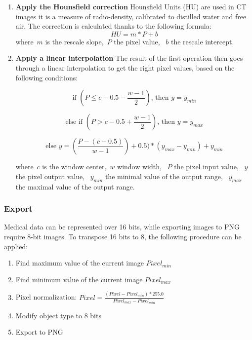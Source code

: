 \begin{enumerate}
	\item \textbf{Apply the Hounsfield correction}\newline
	Hounsfield Units (HU) are used in CT images it is a measure of radio-density, calibrated to distilled water and free air. The correction is calculated thanks to the following formula:
\begin{equation}
	HU = m * P + b
\end{equation}
	where~$m$ is the rescale slope,~$P$ the pixel value, ~$b$ the rescale intercept.

	\item \textbf{Apply a linear interpolation}\newline
	The result of the first operation then goes through a linear interpolation to get the right pixel values, based on the following conditions: 

\begin{equation}
\textrm{if } (P \leq c - 0.5 - \frac{w-1}{2}) \textrm{, then }y = y_{min}
\end{equation}

\begin{equation}
\textrm{else if } (P > c - 0.5 + \frac{w-1}{2}) \textrm{, then }y = y_{max}
\end{equation}

\begin{equation}
\textrm{else } y = (\frac{P - (c - 0.5)}{w-1}) + 0.5) * (y_{max} - y_{min}) + y_{min}
\end{equation}

where~$c$ is the window center,~$w$ window width, ~$P$ the pixel input value, ~$y$ the pixel output value, ~$y_{min}$ the minimal value of the output range, ~$y_{max}$ the maximal value of the output range.


\end{enumerate}


\subsubsection{Export}
Medical data can be represented over 16 bits, while exporting images to PNG require 8-bit images. To transpose 16 bits to 8, the following procedure can be applied:

\begin{enumerate}
	\item Find maximum value of the current image $Pixel_{min}$
	\item Find minimum value of the current image $Pixel_{max}$
	\item Pixel normalization: $Pixel = \frac{(Pixel - Pixel_{min}) * 255.0}{Pixel_{max} - Pixel_{min}}$
	\item Modify object type to 8 bits
	\item Export to PNG
\end{enumerate}